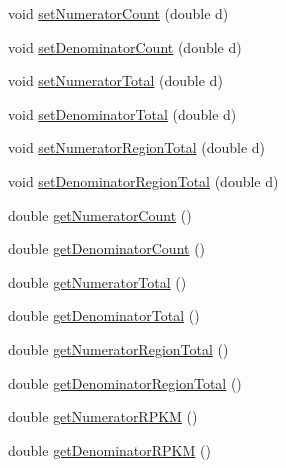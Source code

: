 \begin{DoxyCompactItemize}
\item 
void \hyperlink{classumms_1_1core_1_1model_1_1score_1_1_ratio_score_acf30a764e757d4b4f615fd1bf5badffd}{set\+Numerator\+Count} (double d)
\item 
void \hyperlink{classumms_1_1core_1_1model_1_1score_1_1_ratio_score_a26d2ff4e83dc5437ee4e1ea9514cb26b}{set\+Denominator\+Count} (double d)
\item 
void \hyperlink{classumms_1_1core_1_1model_1_1score_1_1_ratio_score_afb05332cdd6719b45337c0badfe84f7f}{set\+Numerator\+Total} (double d)
\item 
void \hyperlink{classumms_1_1core_1_1model_1_1score_1_1_ratio_score_a020ab1ef12903c21438c2a2fd676b495}{set\+Denominator\+Total} (double d)
\item 
void \hyperlink{classumms_1_1core_1_1model_1_1score_1_1_ratio_score_a36ba05b15a6e54eaf8fbe20d835b1875}{set\+Numerator\+Region\+Total} (double d)
\item 
void \hyperlink{classumms_1_1core_1_1model_1_1score_1_1_ratio_score_a84b557325165848135276d69c99d246e}{set\+Denominator\+Region\+Total} (double d)
\item 
double \hyperlink{classumms_1_1core_1_1model_1_1score_1_1_ratio_score_af7b4d14fef9b8f950b5b6d42d74db4bb}{get\+Numerator\+Count} ()
\item 
double \hyperlink{classumms_1_1core_1_1model_1_1score_1_1_ratio_score_a016968c6cc0959776ace843c2c784616}{get\+Denominator\+Count} ()
\item 
double \hyperlink{classumms_1_1core_1_1model_1_1score_1_1_ratio_score_acb1ab9baaeec7bc88420b065a09a4060}{get\+Numerator\+Total} ()
\item 
double \hyperlink{classumms_1_1core_1_1model_1_1score_1_1_ratio_score_a97082aeb1ae49329276a789ba12124cb}{get\+Denominator\+Total} ()
\item 
double \hyperlink{classumms_1_1core_1_1model_1_1score_1_1_ratio_score_a2dedcf22da864a46a6e805a398c79a63}{get\+Numerator\+Region\+Total} ()
\item 
double \hyperlink{classumms_1_1core_1_1model_1_1score_1_1_ratio_score_ae3a38c4eee8dfbfad80c674ee621d549}{get\+Denominator\+Region\+Total} ()
\item 
double \hyperlink{classumms_1_1core_1_1model_1_1score_1_1_ratio_score_afe24f7cc069f72f5f01dd4dabe558bda}{get\+Numerator\+R\+P\+K\+M} ()
\item 
double \hyperlink{classumms_1_1core_1_1model_1_1score_1_1_ratio_score_a3dcbd0b94b85adddb54348d075650260}{get\+Denominator\+R\+P\+K\+M} ()
\item 

\end{DoxyCompactItemize}
